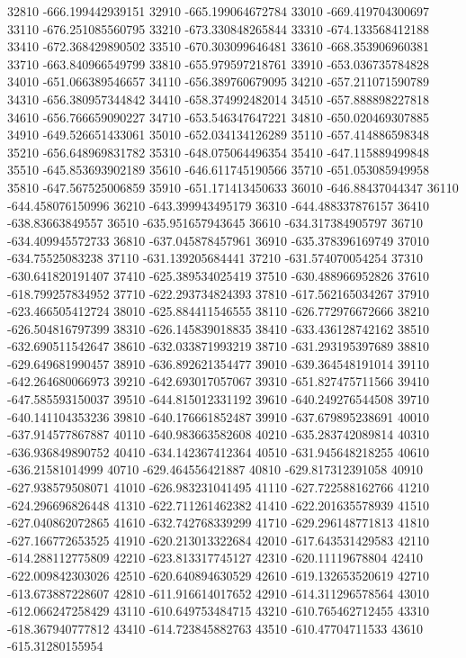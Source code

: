 {32810 -666.199442939151
32910 -665.199064672784
33010 -669.419704300697
33110 -676.251085560795
33210 -673.330848265844
33310 -674.133568412188
33410 -672.368429890502
33510 -670.303099646481
33610 -668.353906960381
33710 -663.840966549799
33810 -655.979597218761
33910 -653.036735784828
34010 -651.066389546657
34110 -656.389760679095
34210 -657.211071590789
34310 -656.380957344842
34410 -658.374992482014
34510 -657.888898227818
34610 -656.766659090227
34710 -653.546347647221
34810 -650.020469307885
34910 -649.526651433061
35010 -652.034134126289
35110 -657.414886598348
35210 -656.648969831782
35310 -648.075064496354
35410 -647.115889499848
35510 -645.853693902189
35610 -646.611745190566
35710 -651.053085949958
35810 -647.567525006859
35910 -651.171413450633
36010 -646.88437044347
36110 -644.458076150996
36210 -643.399943495179
36310 -644.488337876157
36410 -638.83663849557
36510 -635.951657943645
36610 -634.317384905797
36710 -634.409945572733
36810 -637.045878457961
36910 -635.378396169749
37010 -634.75525083238
37110 -631.139205684441
37210 -631.574070054254
37310 -630.641820191407
37410 -625.389534025419
37510 -630.488966952826
37610 -618.799257834952
37710 -622.293734824393
37810 -617.562165034267
37910 -623.466505412724
38010 -625.884411546555
38110 -626.772976672666
38210 -626.504816797399
38310 -626.145839018835
38410 -633.436128742162
38510 -632.690511542647
38610 -632.033871993219
38710 -631.293195397689
38810 -629.649681990457
38910 -636.892621354477
39010 -639.364548191014
39110 -642.264680066973
39210 -642.693017057067
39310 -651.827475711566
39410 -647.585593150037
39510 -644.815012331192
39610 -640.249276544508
39710 -640.141104353236
39810 -640.176661852487
39910 -637.679895238691
40010 -637.914577867887
40110 -640.983663582608
40210 -635.283742089814
40310 -636.936849890752
40410 -634.142367412364
40510 -631.945648218255
40610 -636.21581014999
40710 -629.464556421887
40810 -629.817312391058
40910 -627.938579508071
41010 -626.983231041495
41110 -627.722588162766
41210 -624.296696826448
41310 -622.711261462382
41410 -622.201635578939
41510 -627.040862072865
41610 -632.742768339299
41710 -629.296148771813
41810 -627.166772653525
41910 -620.213013322684
42010 -617.643531429583
42110 -614.288112775809
42210 -623.813317745127
42310 -620.11119678804
42410 -622.009842303026
42510 -620.640894630529
42610 -619.132653520619
42710 -613.673887228607
42810 -611.916614017652
42910 -614.311296578564
43010 -612.066247258429
43110 -610.649753484715
43210 -610.765462712455
43310 -618.367940777812
43410 -614.723845882763
43510 -610.47704711533
43610 -615.31280155954
}
